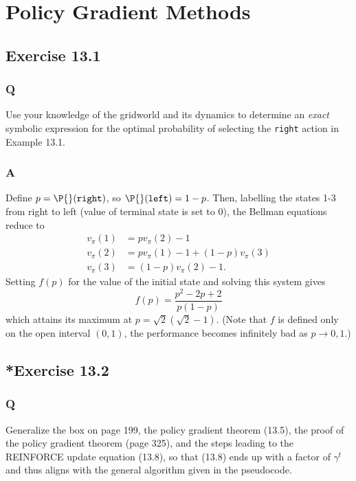 \section{Policy Gradient Methods}

\subsection{Exercise 13.1}
\subsubsection*{Q}
Use your knowledge of the gridworld and its dynamics to determine an \emph{exact} symbolic expression for the optimal probability of selecting the \texttt{right} action in Example 13.1.

\subsubsection*{A}
Define $p = \P{}(\texttt{right})$, so $\P{}(\texttt{left}) = 1-p$. Then, labelling the states 1-3 from right to left (value of terminal state is set to 0), the Bellman equations reduce to
\begin{align*}
    v_\pi(1) &= p v_\pi(2) - 1\\
    v_\pi(2) &= pv_\pi(1) - 1 + (1-p)v_\pi(3) \\
    v_\pi(3) &= (1-p)v_\pi(2) - 1.
\end{align*}
Setting $f(p)$ for the value of the initial state and solving this system gives
\[
    f(p) = \frac{p^2 - 2p + 2}{p(1-p)}
\]
which attains its maximum at $p = \sqrt{2}(\sqrt{2} - 1)$. (Note that $f$ is defined only on the open interval $(0, 1)$, the performance becomes infinitely bad as $p \to 0, 1$.)


\subsection{*Exercise 13.2}
\subsubsection*{Q}
Generalize the box on page 199, the policy gradient theorem (13.5), the proof of the policy gradient theorem (page 325), and the steps leading to the REINFORCE update equation (13.8), so that (13.8) ends up with a factor of $\gamma^t$ and thus aligns with the general algorithm given in the pseudocode.

